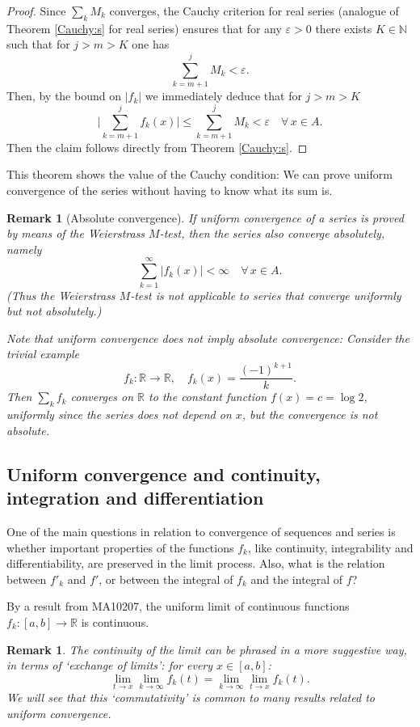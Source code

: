 \documentclass[a4paper,reqno]{amsart}
\numberwithin{equation}{section}
\newtheorem{remark}[definition]{Remark}
\def\N{\mathbb{N}}
\def\R{\mathbb{R}}
\begin{document}
\begin{proof}
Since $\sum_k M_k$ converges, the Cauchy criterion for real series (analogue of Theorem \ref{Cauchy:s} for real series) ensures that for any $\varepsilon>0$ there exists $K\in \N$ such that for $j>m>K$ one has
$$
\sum_{k=m+1}^j M_k < \varepsilon.
$$
Then, by the bound on $|f_k|$ we immediately deduce that for $j>m>K$
$$
\Bigg| \sum_{k=m+1}^j f_k(x)\Bigg| \leq \sum_{k=m+1}^j M_k < \varepsilon \quad \forall\, x\in A.
$$
Then the claim follows directly from Theorem \ref{Cauchy:s}.
\end{proof}

This theorem shows the value of the Cauchy condition: We can prove uniform convergence of the series without having to know what its sum is.

\begin{remark}[Absolute convergence]
If uniform convergence of a series is proved by means of the Weierstrass $M$-test, then the series also converge absolutely, namely 
$$
\sum_{k=1}^\infty |f_k(x)| <\infty \quad \forall \, x\in A.
$$
(Thus the Weierstrass $M$-test is not applicable to series that converge uniformly but not absolutely.)

Note that uniform convergence does not imply absolute convergence: Consider the trivial example 
$$
f_k:\R\to \R, \quad f_k(x) = \frac{(-1)^{k+1}}{k}.
$$
Then $\sum_k f_k$ converges on $\R$ to the constant function $f(x)=c=\log 2$, uniformly since the series does not depend on $x$, but the convergence is not absolute.
\end{remark}


\subsection{Uniform convergence and continuity, integration and differentiation}

One of the main questions in relation to convergence of sequences and series is whether important properties of the functions $f_k$, like continuity, integrability and differentiability, are preserved in the limit process. Also, what is the relation between $f'_k$ and $f'$, or between the integral of $f_k$ and the integral of $f$?
\medskip

By a result from MA10207, the uniform limit of continuous functions $f_k:[a,b]\to \R$ is continuous. 

\begin{remark}
The continuity of the limit can be phrased in a more suggestive way, in terms of `exchange of limits': for every $x\in [a,b]$:
$$
\lim_{t\to x} \lim_{k\to \infty} f_k(t) = \lim_{k\to \infty}\lim_{t\to x} f_k(t).
$$
We will see that this `commutativity' is common to many results related to uniform convergence.
\end{remark}
\end{document}
